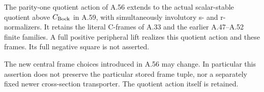 The parity-one quotient action of A.56 extends to the actual
scalar-stable quotient above \(C_{\rm Bock}\) in A.59, with
simultaneously involutory s- and r-normalizers. It retains the
literal C-frames of A.33 and the earlier A.47--A.52 finite
families. A full positive peripheral lift realizes this quotient
action and these frames. Its full negative square is not asserted.

The new central frame choices introduced in A.56 may change.
In particular this assertion does not preserve the particular
stored  frame tuple, nor
a separately fixed newer cross-section transporter. The quotient
action itself is retained.

